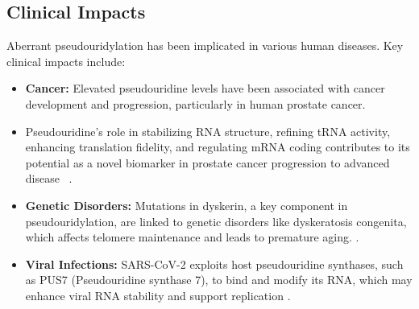   \subsection*{Clinical Impacts}
    Aberrant pseudouridylation has been implicated in various human diseases.
    Key clinical impacts include:
    \begin{itemize}
      \item \textbf{Cancer:} Elevated pseudouridine levels have been associated with cancer development and progression, particularly in human prostate cancer.
      \item Pseudouridine's role in stabilizing RNA structure, refining tRNA activity, enhancing translation fidelity, and regulating mRNA coding contributes to its potential as a novel biomarker in prostate cancer progression to advanced disease ~\cite{stockert_pseudouridine_2021}.
      \item \textbf{Genetic Disorders:} Mutations in dyskerin, a key component in pseudouridylation, are linked to genetic disorders like dyskeratosis congenita, which affects telomere maintenance and leads to premature aging. \cite{garus_dyskerin_2021}.
      \item \textbf{Viral Infections:} SARS-CoV-2 exploits host pseudouridine synthases, such as PUS7 (Pseudouridine synthase 7), to bind and modify its RNA, which may enhance viral RNA stability and support replication \cite{giambruno_unveiling_2023}.
    \end{itemize}
